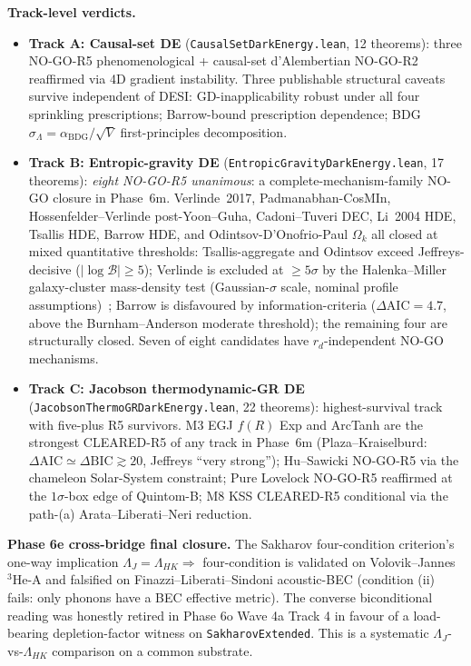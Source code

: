 \documentclass[aps,prd,reprint,nofootinbib,superscriptaddress]{revtex4-2}
\begin{document}
\textbf{Track-level verdicts.}
\begin{itemize}
\item \textbf{Track A: Causal-set DE} (\texttt{CausalSetDarkEnergy.lean},
  12 theorems): three NO-GO-R5 phenomenological + causal-set
  d'Alembertian NO-GO-R2 reaffirmed via 4D gradient instability.
  Three publishable structural caveats survive independent of DESI:
  GD-inapplicability robust under all four sprinkling prescriptions;
  Barrow-bound prescription dependence; BDG
  $\sigma_\Lambda = \alpha_{\mathrm{BDG}}/\sqrt{V}$ first-principles
  decomposition.
\item \textbf{Track B: Entropic-gravity DE}
  (\texttt{EntropicGravityDarkEnergy.lean}, 17 theorems): \emph{eight
  NO-GO-R5 unanimous}: a complete-mechanism-family NO-GO closure
  in Phase~6m. Verlinde~2017, Padmanabhan-CosMIn,
  Hossenfelder--Verlinde post-Yoon--Guha, Cadoni--Tuveri DEC, Li~2004
  HDE, Tsallis HDE, Barrow HDE, and Odintsov-D'Onofrio-Paul
  $\Omega_k$ all closed at mixed quantitative thresholds:
  Tsallis-aggregate and Odintsov exceed Jeffreys-decisive
  ($|\!\log\mathcal{B}| \geq 5$); Verlinde is excluded at
  $\geq 5\sigma$ by the Halenka--Miller galaxy-cluster mass-density
  test (Gaussian-$\sigma$ scale, nominal profile
  assumptions)~\cite{HalenkaMiller2020}; Barrow is disfavoured by
  information-criteria ($\Delta\!\mathrm{AIC} = 4.7$, above the
  Burnham--Anderson moderate threshold); the remaining four are
  structurally closed. Seven of eight candidates have
  $r_d$-independent NO-GO mechanisms.
\item \textbf{Track C: Jacobson thermodynamic-GR DE}
  (\texttt{JacobsonThermoGRDarkEnergy.lean}, 22 theorems):
  highest-survival track with five-plus R5 survivors. M3 EGJ $f(R)$
  Exp and ArcTanh are the strongest CLEARED-R5 of any track in
  Phase~6m (Plaza--Kraiselburd:
  $\Delta\!\mathrm{AIC} \simeq \Delta\!\mathrm{BIC} \gtrsim 20$,
  Jeffreys ``very strong''); Hu--Sawicki NO-GO-R5 via the chameleon
  Solar-System constraint; Pure Lovelock NO-GO-R5 reaffirmed at the
  $1\sigma$-box edge of Quintom-B; M8 KSS CLEARED-R5 conditional via
  the path-(a) Arata--Liberati--Neri reduction.
\end{itemize}

\textbf{Phase 6e cross-bridge final closure.} The Sakharov
four-condition criterion's one-way implication
$\Lambda_J = \Lambda_{HK} \Rightarrow$ four-condition is validated on
Volovik--Jannes ${}^3\mathrm{He}$-A and falsified on
Finazzi--Liberati--Sindoni acoustic-BEC (condition (ii) fails: only
phonons have a BEC effective metric). The converse biconditional
reading was honestly retired in Phase 6o Wave 4a Track 4 in favour of
a load-bearing depletion-factor witness on \texttt{SakharovExtended}.
This is a systematic $\Lambda_J$-vs-$\Lambda_{HK}$ comparison on a
common substrate.
\end{document}

